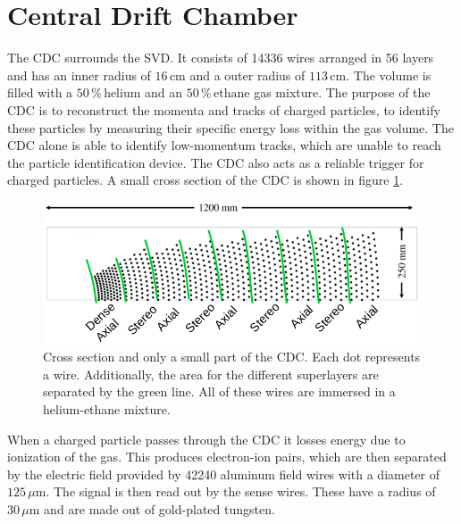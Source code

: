 \documentclass[a4paper,11pt,twosided,final,german,openbib,pdftex,listof=totoc,bibliography=totoc]{scrbook}
\begin{document}
\section{Central Drift Chamber}
\label{sec:CDC}

The CDC surrounds the SVD. It consists of 14336 wires arranged in 56 layers and has an inner radius of $16\,\textrm{cm}$ and a outer radius of $113\,\textrm{cm}$. The volume is filled with a $50\,\%\,\textrm{helium}$ and an $50\,\%\,\textrm{ethane}$ gas mixture. The purpose of the CDC is to reconstruct the momenta and tracks of charged particles, to identify these particles by measuring their specific energy loss within the gas volume. The CDC alone is able to identify low-momentum tracks, which are unable to reach the particle identification device. The CDC also acts as a reliable trigger for charged particles.\cite{B2TR} A small cross section of the CDC is shown in figure \ref{fig:CDC}.

\begin{figure}[h!] 
	\centering
	\includegraphics[width=\textwidth]{Bilder/CDC}
	\caption[Central Drift Chamber]{Cross section and only a small part of the CDC. Each dot represents a wire. Additionally, the area for the different superlayers are separated by the green line. All of these wires are immersed in a helium-ethane mixture.\cite{CDCHauth}}
	\label{fig:CDC}
\end{figure}

When a charged particle passes through the CDC it losses energy due to ionization of the gas. This produces electron-ion pairs, which are then separated by the electric field provided by 42240 aluminum field wires with a diameter of $125\,\mu\textrm{m}$. The signal is then read out by the sense wires. These have a radius of $30\,\mu\textrm{m}$ and are made out of gold-plated tungsten.\cite{B2TR} 
\end{document}
